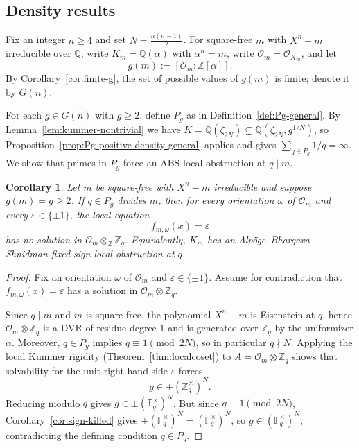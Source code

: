 \documentclass[11pt,letterpaper]{amsart}
\newcommand{\Z}{\mathbb{Z}}
\newcommand{\Q}{\mathbb{Q}}
\newcommand{\F}{\mathbb{F}}
\newcommand{\Ocal}{\mathcal{O}}
\theoremstyle{plain}
\newtheorem{corollary}[theorem]{Corollary}
\theoremstyle{definition}
\theoremstyle{remark}
\theoremstyle{plain}
\begin{document}
\subsection{Density results}
\label{sec:many-prime-sieve}



Fix an integer $n\ge 4$ and set $N=\frac{n(n-1)}2$.
For square-free $m$ with $X^n-m$ irreducible over $\Q$, write $K_m=\Q(\alpha)$ with $\alpha^n=m$,
write $\Ocal_m=\Ocal_{K_m}$, and let
\[
g(m):=[\Ocal_m:\Z[\alpha]].
\]
By Corollary~\ref{cor:finite-g}, the set of possible values of $g(m)$ is finite; denote it by $G(n)$.

For each $g\in G(n)$ with $g\ge 2$, define $P_g$ as in Definition~\ref{def:Pg-general}.
By Lemma~\ref{lem:kummer-nontrivial} we have $K=\Q(\zeta_{2N})\subsetneq \Q(\zeta_{2N},g^{1/N})$,
so Proposition~\ref{prop:Pg-positive-density-general} applies and gives $\sum_{q\in P_g}1/q=\infty$. We show that primes in $P_g$ force an ABS local obstruction at $q\mid m$.

\begin{corollary}
\label{cor:Pg-obstruct}
Let $m$ be square-free with $X^n-m$ irreducible and suppose $g(m)=g\ge 2$.
If $q\in P_g$ divides $m$, then for every orientation $\omega$ of $\Ocal_m$ and every $\varepsilon\in\{\pm 1\}$,
the local equation
\[
f_{m,\omega}(x)=\varepsilon
\]
has no solution in $\Ocal_m\otimes_{\Z}\Z_q$.
Equivalently, $K_m$ has an Alp\"oge--Bhargava--Shnidman fixed-sign local obstruction at $q$.
\end{corollary}

\begin{proof}
Fix an orientation $\omega$ of $\Ocal_m$ and $\varepsilon\in\{\pm1\}$.
Assume for contradiction that $f_{m,\omega}(x)=\varepsilon$ has a solution in $\Ocal_m\otimes\Z_q$.

Since $q\mid m$ and $m$ is square-free, the polynomial $X^n-m$ is Eisenstein at $q$, hence
$\Ocal_m\otimes\Z_q$ is a DVR of residue degree $1$ and is generated over $\Z_q$ by the uniformizer $\alpha$.
Moreover, $q\in P_g$ implies $q\equiv 1\pmod{2N}$, so in particular $q\nmid N$.
Applying the local Kummer rigidity (Theorem~\ref{thm:localcoset}) to $A=\Ocal_m\otimes\Z_q$ shows that
solvability for the unit right-hand side $\varepsilon$ forces
\[
g\in \pm(\Z_q^\times)^N.
\]
Reducing modulo $q$ gives $g\in \pm(\F_q^\times)^N$.
But since $q\equiv 1\pmod{2N}$, Corollary~\ref{cor:sign-killed} gives $\pm(\F_q^\times)^N=(\F_q^\times)^N$,
so $g\in(\F_q^\times)^N$, contradicting the defining condition $q\in P_g$.
\end{proof}
\end{document}
